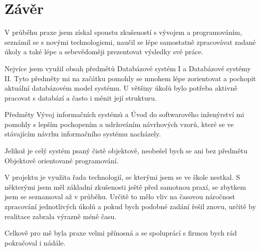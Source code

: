 \chapter{Závěr}
V průběhu praxe jsem získal spoustu zkušeností s vývojem a programováním, seznámil se s novými technologiemi, naučil se lépe samostatně zpracovávat zadané úkoly a také lépe a sebevědoměji prezentovat výsledky své práce. 

Nejvíce jsem využil obsah předmětů Databázové systém I a Databázové systémy II. Tyto předměty mi na začátku pomohly se mnohem lépe zorientovat a pochopit aktuální databázovém model systému. U většiny úkolů bylo potřeba aktivně pracovat s databází a často i měnit její strukturu.

Předměty Vývoj informačních systémů a Úvod do softwarového inženýrství mi pomohly s lepším pochopením a udržováním návrhových vzorů, které se ve stávajícím návrhu informačního systému nacházely. 

Jelikož je celý systém psaný čistě objektově, neobešel bych se ani bez předmětu Objektově orientované programování.

V projektu je využita řada technologií, se kterými jsem se ve škole nestkal. S některými jsem měl základní zkušenosti ještě před samotnou praxí, se zbytkem jsem se seznamoval až v průběhu. Určitě to mělo vliv na časovou náročnost zpracování jednotlivých úkolů a pokud bych podobné zadání řešil znovu, určitě by realitace zabrala výrazně méně času.

Celkově pro mě byla praxe velmi přínosná a se spoluprácí s firmou bych rád pokračoval i nádále.
\endinput